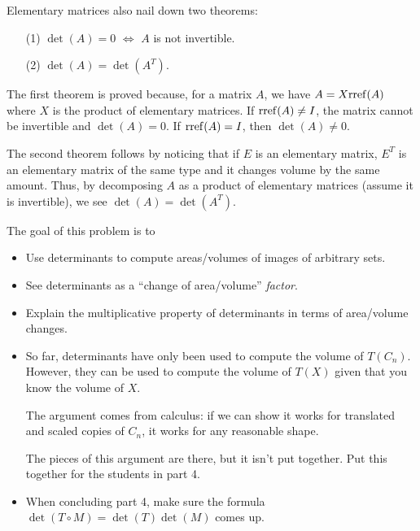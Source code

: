 \documentclass{problemset}
\newcommand{\bookonlynewpage}{\begin{bookonly}\newpage\end{bookonly}}
\begin{document}
\begin{lesson}
	Elementary matrices also nail down two theorems:
	\begin{enumerate}
		\item[(1)] $\det(A) = 0$ $\iff$ $A$ is not invertible.
		\item[(2)] $\det(A)=\det(A^T)$.
	\end{enumerate}

	The first theorem is proved because, for a matrix $A$, we have $A=X\!\operatorname{rref}(A)$ where $X$ is the product of elementary matrices.
	If $\operatorname{rref}(A)\neq I$, the matrix cannot be invertible and $\det(A)=0$. If $\operatorname{rref}(A)=I$, then $\det(A)\neq 0$.

	The second theorem follows by noticing that if $E$ is an elementary matrix, $E^T$ is an elementary matrix 
	of the same type and it changes volume by the same amount. Thus, by decomposing $A$ as a product of elementary
	matrices (assume it is invertible), we see $\det(A)=\det(A^T)$.

\end{lesson}
	\bookonlynewpage
	\question
	\begin{annotation}
		\begin{goals}

			The goal of this problem is to
			\begin{itemize}
				\item Use determinants to compute areas/volumes of images of
					arbitrary sets.
				\item See determinants as a ``change of area/volume'' \emph{factor}.
				\item Explain the multiplicative property of determinants in
					terms of area/volume changes.
			\end{itemize}
		\end{goals}

		\begin{notes}
			\begin{itemize}
				\item So far, determinants have only been used to compute
					the volume of $T(C_n)$. However, they can be used to compute
					the volume of $T(X)$ given that you know the volume of $X$.

					The argument comes from calculus: if we can show it works
					for translated and scaled copies of $C_n$, it works for any 
					reasonable shape.

					The pieces of this argument are there, but it isn't put together.
					Put this together for the students in part 4.
				\item When concluding part 4, make sure the formula $\det(T\circ M)=
					\det(T)\det(M)$ comes up.
			\end{itemize}
		\end{notes}
	\end{annotation}
\end{document}
